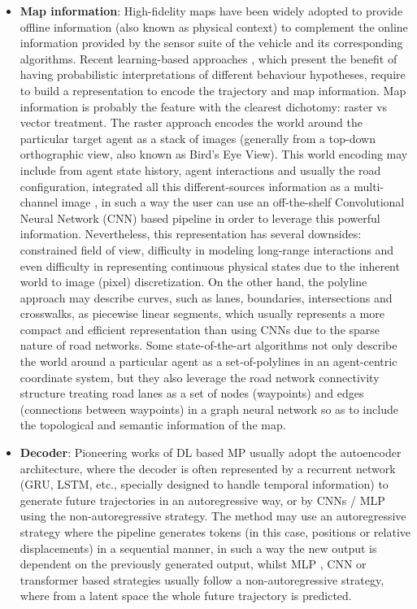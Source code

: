 \begin{itemize}
	\item \textbf{Map information}: High-fidelity maps \cite{can2022maps} have been widely adopted to provide offline information (also known as physical context) to complement the online information provided by the sensor suite of the vehicle and its corresponding algorithms. Recent learning-based approaches \cite{mahjourian2022occupancy, casas2018intentnet, ivanovic2021heterogeneous}, which present the benefit of having probabilistic interpretations of different behaviour hypotheses, require to build a representation to encode the trajectory and map information. Map information is probably the feature with the clearest dichotomy: raster vs vector treatment. The raster approach encodes the world around the particular target agent as a stack of images (generally from a top-down orthographic view, also known as Bird's Eye View). This world encoding may include from agent state history, agent interactions and usually the road configuration, integrated all this different-sources information as a multi-channel image \cite{gilles2021home}, in such a way the user can use an off-the-shelf Convolutional Neural Network (CNN) based pipeline in order to leverage this powerful information. Nevertheless, this representation has several downsides: constrained field of view, difficulty in modeling long-range interactions and even difficulty in representing continuous physical states due to the inherent world to image (pixel) discretization. On the other hand, the polyline approach may describe curves, such as lanes, boundaries, intersections and crosswalks, as piecewise linear segments, which usually represents a more compact and efficient representation than using CNNs due to the sparse nature of road networks. Some state-of-the-art algorithms not only describe the world around a particular agent as a set-of-polylines \cite{khandelwal2020if} \cite{zhao2021tnt} in an agent-centric coordinate system, but they also leverage the road network connectivity structure \cite{liang2020learning} \cite{zeng2021lanercnn} treating road lanes as a set of nodes (waypoints) and edges (connections between waypoints) in a graph neural network so as to include the topological and semantic information of the map.
	
	\item \textbf{Decoder}: Pioneering works of DL based MP usually adopt the autoencoder architecture, where the decoder is often represented by a recurrent network (GRU, LSTM, etc., specially designed to handle temporal information) to generate future trajectories in an autoregressive way, or by CNNs \cite{gilles2021home} \cite{gilles2022gohome} / MLP \cite{liang2020learning} \cite{schmidt2022crat} using the non-autoregressive strategy. The method may use an autoregressive strategy where the pipeline generates tokens (in this case, positions or relative displacements) in a sequential manner, in such a way the new output is dependent on the previously generated output, whilst MLP \cite{schmidt2022crat}, CNN \cite{gilles2021home} or transformer \cite{ngiam2022scene} based strategies usually follow a non-autoregressive strategy, where from a latent space the whole future trajectory is predicted.
	

\end{itemize}
